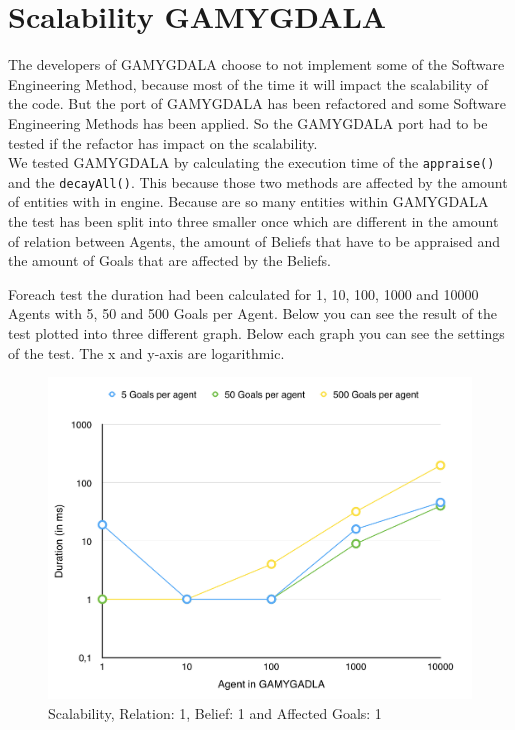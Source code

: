\section{Scalability GAMYGDALA}
The developers of GAMYGDALA choose to not implement some of the Software Engineering Method, because most of the time it will impact the scalability of the code.
But the port of GAMYGDALA has been refactored and some Software Engineering Methods has been applied. So the GAMYGDALA port had to be tested if the refactor has impact on the scalability. \\

We tested GAMYGDALA by calculating the execution time of the \texttt{appraise()} and the \texttt{decayAll()}. This because those two methods are affected by the amount of entities with in engine. Because are so many entities within GAMYGDALA the test has been split into three smaller once which are different in the amount of relation between Agents, the amount of Beliefs that have to be appraised and the amount of Goals that are affected by the Beliefs.

Foreach test the duration had been calculated for 1, 10, 100, 1000 and 10000 Agents with 5, 50 and 500 Goals per Agent. Below you can see the result of the test plotted into three different graph. Below each graph you can see the settings of the test. The x and y-axis are logarithmic.

\begin{figure}[H]
  \centering
  \includegraphics[scale=0.5]{scalability/1.jpg}
  \caption{Scalability, Relation: 1, Belief: 1 and Affected Goals: 1}
  \label{scala:first}
\end{figure}

